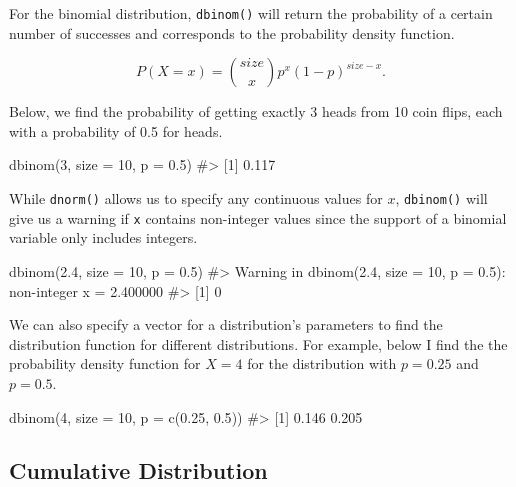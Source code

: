 \documentclass[
  letterpaper,
]{krantz}
\makeatletter
\newenvironment{Shaded}{\begin{snugshade}}{\end{snugshade}}
\newcommand{\AttributeTok}[1]{\textcolor[rgb]{0.40,0.45,0.13}{#1}}
\newcommand{\CommentTok}[1]{\textcolor[rgb]{0.37,0.37,0.37}{#1}}
\newcommand{\DecValTok}[1]{\textcolor[rgb]{0.68,0.00,0.00}{#1}}
\newcommand{\FloatTok}[1]{\textcolor[rgb]{0.68,0.00,0.00}{#1}}
\newcommand{\FunctionTok}[1]{\textcolor[rgb]{0.28,0.35,0.67}{#1}}
\newcommand{\NormalTok}[1]{\textcolor[rgb]{0.00,0.23,0.31}{#1}}
\newenvironment{kframe}{%
\medskip{}
\setlength{\fboxsep}{.8em}
 \def\at@end@of@kframe{}%
 \ifinner\ifhmode%
  \def\at@end@of@kframe{\end{minipage}}%
  \begin{minipage}{\columnwidth}%
 \fi\fi%
 \def\FrameCommand##1{\hskip\@totalleftmargin \hskip-\fboxsep
 \colorbox{shadecolor}{##1}\hskip-\fboxsep
     \hskip-\linewidth \hskip-\@totalleftmargin \hskip\columnwidth}%
 \MakeFramed {\advance\hsize-\width
   \@totalleftmargin\z@ \linewidth\hsize
   \@setminipage}}%
 {\par\unskip\endMakeFramed%
 \at@end@of@kframe}
\renewenvironment{Shaded}{\begin{kframe}}{\end{kframe}}
\makeatother
\begin{document}
For the binomial distribution, \texttt{dbinom()} will return the
probability of a certain number of successes and corresponds to the
probability density function.

\[ P(X = x) = \binom{size}{x} p^x (1-p)^{size-x}. \]

Below, we find the probability of getting exactly 3 heads from 10 coin
flips, each with a probability of 0.5 for heads.

\begin{Shaded}
\begin{Highlighting}[]
\FunctionTok{dbinom}\NormalTok{(}\DecValTok{3}\NormalTok{, }\AttributeTok{size =} \DecValTok{10}\NormalTok{, }\AttributeTok{p =} \FloatTok{0.5}\NormalTok{)}
\CommentTok{\#\textgreater{} [1] 0.117}
\end{Highlighting}
\end{Shaded}

While \texttt{dnorm()} allows us to specify any continuous values for
\(x\), \texttt{dbinom()} will give us a warning if \texttt{x} contains
non-integer values since the support of a binomial variable only
includes integers.

\begin{Shaded}
\begin{Highlighting}[]
\FunctionTok{dbinom}\NormalTok{(}\FloatTok{2.4}\NormalTok{, }\AttributeTok{size =} \DecValTok{10}\NormalTok{, }\AttributeTok{p =} \FloatTok{0.5}\NormalTok{)}
\CommentTok{\#\textgreater{} Warning in dbinom(2.4, size = 10, p = 0.5): non{-}integer x = 2.400000}
\CommentTok{\#\textgreater{} [1] 0}
\end{Highlighting}
\end{Shaded}

We can also specify a vector for a distribution's parameters to find the
distribution function for different distributions. For example, below I
find the the probability density function for \(X=4\) for the
distribution with \(p=0.25\) and \(p=0.5\).

\begin{Shaded}
\begin{Highlighting}[]
\FunctionTok{dbinom}\NormalTok{(}\DecValTok{4}\NormalTok{, }\AttributeTok{size =} \DecValTok{10}\NormalTok{, }\AttributeTok{p =} \FunctionTok{c}\NormalTok{(}\FloatTok{0.25}\NormalTok{, }\FloatTok{0.5}\NormalTok{))}
\CommentTok{\#\textgreater{} [1] 0.146 0.205}
\end{Highlighting}
\end{Shaded}

\subsection{Cumulative Distribution}\label{cumulative-distribution}
\end{document}
